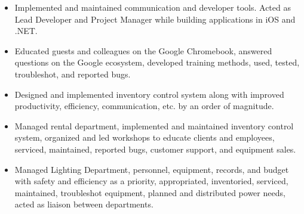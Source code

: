 \documentclass[letterpaper]{article}        %
\begin{document}

  
    \begin{itemize}
    \item Implemented and maintained communication and developer tools.  Acted as Lead Developer and Project Manager while building applications in iOS and .NET.
    \end{itemize}
  
    \begin{itemize}
    \item Educated guests and colleagues on the Google Chromebook, answered questions on the Google ecosystem, developed training methods, used, tested, troubleshot, and reported bugs.
    \end{itemize}
  
    \begin{itemize}
    \item Designed and implemented inventory control system along with improved productivity, efficiency, communication, etc. by an order of magnitude.
    \end{itemize}
  
    \begin{itemize}
    \item Managed rental department, implemented and maintained inventory control system, organized and led workshops to educate clients and employees, serviced, maintained, reported bugs, customer support, and equipment sales.
    \end{itemize}
  
    \begin{itemize}
    \item Managed Lighting Department, personnel, equipment, records, and budget with safety and efficiency as a priority, appropriated, inventoried, serviced, maintained, troubleshot equipment, planned and distributed power needs, acted as liaison between departments.
    \end{itemize}

\end{document}
